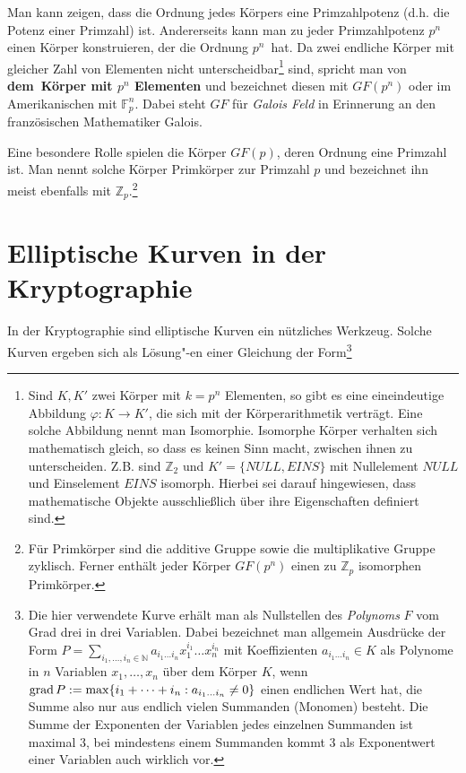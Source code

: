 \begin{refsegment}
Man kann zeigen, dass die Ordnung jedes Körpers eine Primzahlpotenz (d.h. die Potenz einer Primzahl) ist. Andererseits kann man zu jeder Primzahlpotenz $p^n$ einen Körper konstruieren, der die Ordnung $p^n$~hat. Da zwei endliche Körper mit gleicher Zahl von Elementen nicht unterscheidbar\footnote{Sind $K,K'$ zwei Körper mit $k=p^n$ Elementen, so gibt es eine eineindeutige Abbildung $\varphi:K\to K'$, die sich mit der Körperarithmetik verträgt. Eine solche Abbildung nennt man Isomorphie. Isomorphe Körper verhalten sich mathematisch gleich, so dass es keinen Sinn macht, zwischen ihnen zu unterscheiden. Z.B. sind ${\mathbb Z}_2$ und $K'=\{ NULL,EINS\}$ mit Nullelement $NULL$ und Einselement $EINS$ isomorph. Hierbei sei darauf hingewiesen, dass mathematische Objekte ausschließlich über ihre Eigenschaften definiert sind.} sind, spricht man von {\bf dem\ Körper mit $p^n$ Elementen} und bezeichnet diesen mit $GF(p^n)$ oder im Amerikanischen mit
$\mathbb{F}_p^{n}$. Dabei steht $GF$ für {\it Galois Feld} in Erinnerung an den französischen Mathematiker Galois.

Eine besondere Rolle spielen die Körper $GF(p)$, deren Ordnung eine Primzahl ist. Man
nennt solche Körper Primkörper zur Primzahl $p$ und bezeichnet ihn meist ebenfalls
mit ${\mathbb Z}_p$.\footnote{%
  Für Primkörper sind die additive Gruppe sowie die multiplikative Gruppe zyklisch.
  Ferner enthält jeder Körper $GF(p^n)$ einen zu ${\mathbb Z}_p$ isomorphen Primkörper.
}


\section{Elliptische Kurven in der Kryptographie} \label{ECC-Crypto}

In der Kryptographie sind elliptische Kurven ein nützliches Werkzeug. Solche Kurven
ergeben sich als Lösung"-en einer Gleichung der Form\footnote{%
  Die hier verwendete Kurve erhält man als Nullstellen des {\it Polynoms}
  $F$ vom Grad drei in drei Variablen. Dabei bezeichnet man allgemein Ausdrücke der Form
  $P=\sum_{i_1,\dots,i_n\in\mathbb{N}} a_{i_1\dots i_n} x_1^{i_1}\dots x_n^{i_n}$
  mit Koeffizienten $a_{i_1\dots i_n}\in K$ als Polynome in $n$ Variablen $x_1,\dots,x_n$
  über dem Körper $K$, wenn ${\rm grad\,} P:=\max\{i_1+\dots +i_n: a_{i_1\dots i_n}\ne 0\}$
  einen endlichen Wert hat, die Summe also nur aus endlich vielen Summanden (Monomen) besteht.
  Die Summe der Exponenten der Variablen jedes einzelnen Summanden ist maximal $3$,
  bei mindestens einem Summanden kommt $3$ als Exponentwert einer Variablen auch wirklich vor.
}


\end{refsegment}

